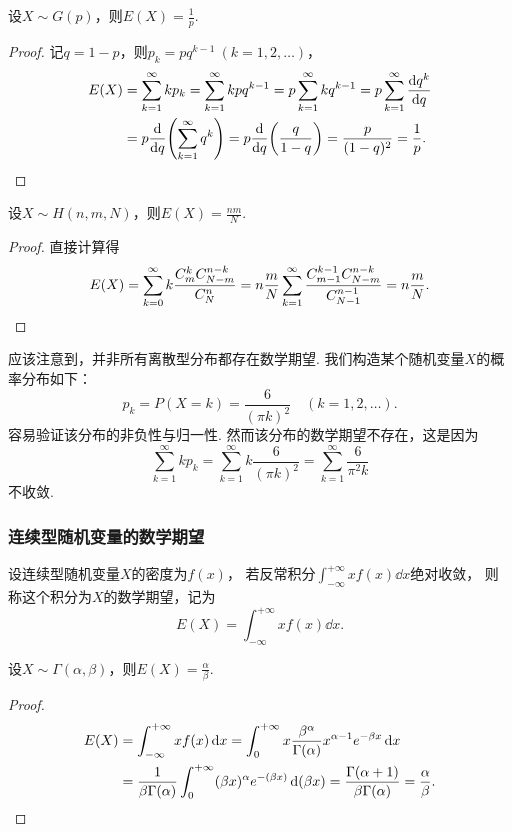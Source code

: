 \begin{theorem}\label{theorem:随机变量的数字特征.几何分布的数学期望}
设\(X \sim G(p)\)，则\(E(X) = \frac{1}{p}\).
\begin{proof}
\def\s{\sum\limits_{k=1}^{\infty}}%
记\(q = 1-p\)，则\(p_k = pq^{k-1}\ (k=1,2,\dotsc)\)，%
\begin{align*}
E(X) &= \s k p_k
= \s k p q^{k-1}
= p \s k q^{k-1}
= p \s \dv{q^k}{q} \\
&= p \dv{q}(\s q^k)
= p \dv{q}(\frac{q}{1-q})
= \frac{p}{(1-q)^2}
= \frac{1}{p}.
\qedhere
\end{align*}
\end{proof}
\end{theorem}

\begin{theorem}
设\(X \sim H(n,m,N)\)，则\(E(X) = \frac{n m}{N}\).
\begin{proof}
\def\s#1{\sum\limits_{k=#1}^{\infty}}%
直接计算得\[
E(X) = \s0 k \frac{C_m^k C_{N-m}^{n-k}}{C_N^n}
= n \frac{m}{N} \s1 \frac{C_{m-1}^{k-1} C_{N-m}^{n-k}}{C_{N-1}^{n-1}}
= n \frac{m}{N}.
\qedhere
\]
\end{proof}
\end{theorem}

应该注意到，并非所有离散型分布都存在数学期望.
我们构造某个随机变量\(X\)的概率分布如下：\[
p_k = P(X=k) = \frac{6}{(\pi k)^2}
\quad(k=1,2,\dotsc).
\]容易验证该分布的非负性与归一性.
然而该分布的数学期望不存在，这是因为\[
\sum\limits_{k=1}^{\infty} k p_k
= \sum\limits_{k=1}^{\infty} k \frac{6}{(\pi k)^2}
= \sum\limits_{k=1}^{\infty} \frac{6}{\pi^2 k}
\]不收敛.

\subsubsection{连续型随机变量的数学期望}
\begin{definition}
设连续型随机变量\(X\)的密度为\(f(x)\)，%
若反常积分\(\int_{-\infty}^{+\infty} x f(x) \dd{x}\)绝对收敛，%
则称这个积分为\(X\)的数学期望，记为\[
E(X) = \int_{-\infty}^{+\infty} x f(x) \dd{x}.
\]
\end{definition}

\begin{theorem}\label{theorem:随机变量的数字特征.伽马分布的数学期望}
设\(X \sim \Gamma(\alpha,\beta)\)，则\(E(X)=\frac{\alpha}{\beta}\).
\begin{proof}
\begin{align*}
E(X)
&= \int_{-\infty}^{+\infty} x f(x) \dd{x}
= \int_0^{+\infty}{ x \frac{\beta^{\alpha}}{\Gamma(\alpha)} x^{\alpha-1} e^{-\beta x} \dd{x}} \\
&= \frac{1}{\beta \Gamma(\alpha)} \int_0^{+\infty} (\beta x)^{\alpha} e^{-(\beta x)} \dd(\beta x)
= \frac{\Gamma(\alpha + 1)}{\beta \Gamma(\alpha)}
= \frac{\alpha}{\beta}.
\qedhere
\end{align*}
\end{proof}
\end{theorem}

